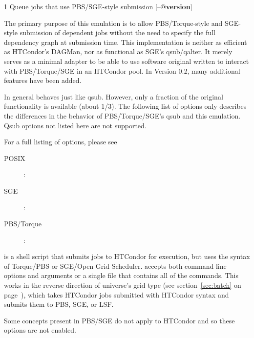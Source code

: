 \begin{ManPage}{\label{man-condor-qsub}}{1}
{Queue jobs that use PBS/SGE-style submission}
\Synopsis {}
[\verb@--@\textbf{version}]


\Description

The primary purpose of this emulation is to allow PBS/Torque-style and 
SGE-style submission of dependent jobs without the need to specify the full
dependency graph at submission time. This implementation is neither as efficient
as HTCondor's DAGMan, nor as functional as SGE's qsub/qalter. It merely serves 
as a minimal adapter to be able to use software original written to interact 
with PBS/Torque/SGE in an HTCondor pool. In Version 0.2, many additional 
features have been added.

In general  behaves just like qsub. However, only a fraction of the
original functionality is available (about 1/3). The following list of options only
describes the differences in the behavior of PBS/Torque/SGE's qsub and this 
emulation. Qsub options not listed here are not supported.

For a full listing of options, please see
\begin{description}
\item[POSIX]: 
\item[SGE]: 
\item[PBS/Torque]: 
\end{description}

 is a shell script that submits jobs to HTCondor for execution, but 
uses the syntax of Torque/PBS or SGE/Open Grid Scheduler.  accepts
both command line options and arguments or a single file that contains all of the 
commands. This works in the reverse direction of  universe's 
 grid type (see section~\ref{sec:batch} on 
page~\pageref{sec:batch}), which takes HTCondor jobs submitted with HTCondor
syntax and submits them to PBS, SGE, or LSF.

Some concepts present in PBS/SGE do not apply to HTCondor and so these options are
not enabled.


\end{ManPage}
